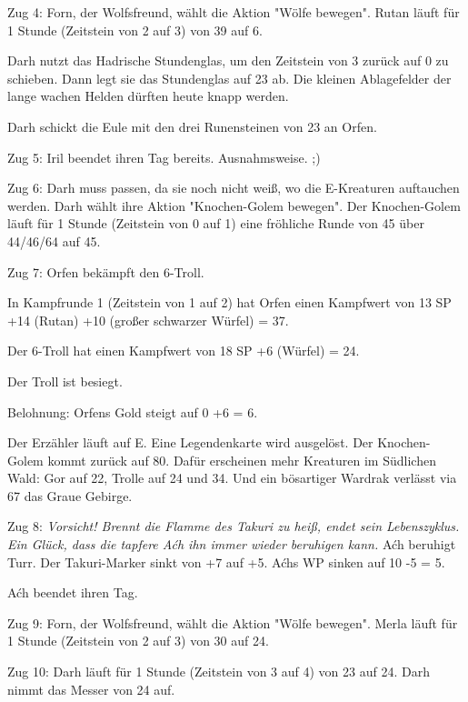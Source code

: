 \documentclass[10pt, a4paper, oneside]{book}
\begin{document}
{Zug 4: Forn, der Wolfsfreund, wählt die Aktion "Wölfe bewegen". Rutan läuft für 1 Stunde (Zeitstein von 2 auf 3) von 39 auf 6.

Darh nutzt das Hadrische Stundenglas, um den Zeitstein von 3 zurück auf 0 zu schieben. Dann legt sie das Stundenglas auf 23 ab. Die kleinen Ablagefelder der lange wachen Helden dürften heute knapp werden.

Darh schickt die Eule mit den drei Runensteinen von 23 an Orfen.



Zug 5: Iril beendet ihren Tag bereits. Ausnahmsweise. ;)



Zug 6: Darh muss passen, da sie noch nicht weiß, wo die E-Kreaturen auftauchen werden. Darh wählt ihre Aktion "Knochen-Golem bewegen". Der Knochen-Golem läuft für 1 Stunde (Zeitstein von 0 auf 1) eine fröhliche Runde von 45 über 44/46/64 auf 45.



Zug 7: Orfen bekämpft den 6-Troll.

In Kampfrunde 1 (Zeitstein von 1 auf 2) hat Orfen einen Kampfwert von 13 SP +14 (Rutan) +10 (großer schwarzer Würfel) = 37.

Der 6-Troll hat einen Kampfwert von 18 SP +6 (Würfel) = 24.

Der Troll ist besiegt.

Belohnung: Orfens Gold steigt auf 0 +6 = 6.

Der Erzähler läuft auf E. Eine Legendenkarte wird ausgelöst. Der Knochen-Golem kommt zurück auf 80. Dafür erscheinen mehr Kreaturen im Südlichen Wald: Gor auf 22, Trolle auf 24 und 34. Und ein bösartiger Wardrak verlässt via 67 das Graue Gebirge.



Zug 8: \textit{Vorsicht! Brennt die Flamme des Takuri zu heiß, endet sein Lebenszyklus. Ein Glück, dass die tapfere Aćh ihn immer wieder beruhigen kann.} Aćh beruhigt Turr. Der Takuri-Marker sinkt von +7 auf +5. Aćhs WP sinken auf 10 -5 = 5.

Aćh beendet ihren Tag.



Zug 9: Forn, der Wolfsfreund, wählt die Aktion "Wölfe bewegen". Merla läuft für 1 Stunde (Zeitstein von 2 auf 3) von 30 auf 24.



Zug 10: Darh läuft für 1 Stunde (Zeitstein von 3 auf 4) von 23 auf 24. Darh nimmt das Messer von 24 auf.



}
\end{document}
